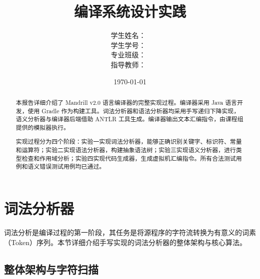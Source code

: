 \documentclass[12pt,hyperref,a4paper,UTF8]{ctexart}
\begin{document}
\title{ \vspace{3cm} \heiti \fontsize{48pt}{56pt}\selectfont \textbf{{编译系统设计实践}} }\par
\vspace{40pt}

\author{
    \vspace{0.5cm}
    \songti\Large 学生姓名：\  \qquad  \\ %
    \vspace{0.5cm}
    \songti\Large  学生学号：\  \qquad  \\ %
    \vspace{0.5cm}
    \songti\Large  专业班级：\  \qquad  \\%
    \vspace{0.5cm}
    \songti\Large  指导教师：\ %
}
\date{\today} %

\cover

\thispagestyle{empty}

\newpage
\tableofcontents

\newpage

\begin{abstract}
本报告详细介绍了 Mandrill v2.0 语言编译器的完整实现过程。编译器采用 Java 语言开发，使用 Gradle 作为构建工具。词法分析器和语法分析器均采用手写递归下降实现，语义分析器与编译器后端借助 ANTLR 工具生成。编译器输出文本汇编指令，由课程组提供的模拟器执行。

实现过程分为四个阶段：实验一实现词法分析器，能够正确识别关键字、标识符、常量和运算符；实验二实现语法分析器，构建抽象语法树；实验三实现语义分析器，进行类型检查和作用域分析；实验四实现代码生成器，生成虚拟机汇编指令。所有合法测试用例和语义错误测试用例均已通过。
\end{abstract}

\section{词法分析器}

词法分析是编译过程的第一阶段，其任务是将源程序的字符流转换为有意义的词素（Token）序列。本节详细介绍手写实现的词法分析器的整体架构与核心算法。

\subsection{整体架构与字符扫描}
\end{document}
